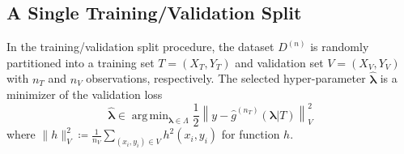 \documentclass[12pt]{article} %
\theoremstyle{definition}
\DeclareMathOperator*{\argmin}{arg\,min}
\begin{document}
\subsection{A Single Training/Validation Split}\label{sec:single}

In the training/validation split procedure, the dataset $D^{(n)}$ is randomly partitioned into a training set $T = (X_T, Y_T)$ and validation set $V = (X_V, Y_V)$ with $n_T$ and $n_V$ observations, respectively.
The selected hyper-parameter $\hat{\boldsymbol{\lambda}}$ is a minimizer of the validation loss
\begin{equation}
\label{eq:train_val_lambda}
\hat{\boldsymbol \lambda} \in \argmin_{\boldsymbol{\lambda} \in\Lambda} \frac{1}{2} \left \| y-\hat{g}^{(n_T)}( \boldsymbol \lambda | T) \right \|_{V}^{2}
\end{equation}
where $\| h \|^2_{V} \coloneqq \frac{1}{n_V}\sum_{(x_i, y_i)\in V} h^2(x_i, y_i)$ for function $h$.
\end{document}
